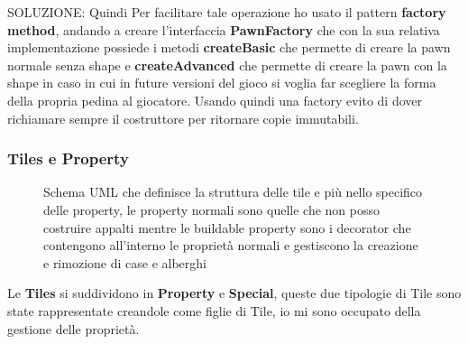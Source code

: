 SOLUZIONE:
Quindi Per facilitare tale operazione ho usato il pattern \textbf{factory method}, andando a creare l'interfaccia \textbf{PawnFactory} 
che con la sua relativa implementazione possiede i metodi \textbf{createBasic} che permette di creare la pawn normale senza shape
e \textbf{createAdvanced} che permette di creare la pawn con la shape in caso in cui in future versioni del gioco si voglia far scegliere la forma della propria pedina al giocatore. 
Usando quindi una factory evito di dover richiamare sempre il costruttore per ritornare copie immutabili.\newline

\subsubsection{Tiles e Property}
\begin{figure}[H]
    \centering
    \caption{Schema UML che definisce la struttura delle tile e più nello specifico delle property, 
    le property normali sono quelle che non posso costruire appalti mentre le buildable property sono i decorator che contengono all'interno le proprietà normali e gestiscono
    la creazione e rimozione di case e alberghi}
	\label{img:Property}
\end{figure}
Le \textbf{Tiles} si suddividono in \textbf{Property} e \textbf{Special}, queste due tipologie di Tile sono state rappresentate creandole come figlie di Tile,
io mi sono occupato della gestione delle proprietà.\newline

